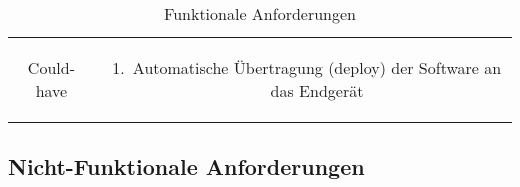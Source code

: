 \begin{table}[h!]
\begin{flushleft}
{\begin{tabular}{|c|c|}
\begin{minipage}{5in}
				\end{minipage} \\
				\hline
				Could-have & 
				\begin{minipage}{5in}
					\begin{enumerate}
						\item Automatische Übertragung (deploy) der Software an das Endgerät
					\end{enumerate}
				\end{minipage} \\
			\hline
			\end{tabular}	
		}
	\end{flushleft}
	\caption{Funktionale Anforderungen}	
\end{table}

\subsection{Nicht-Funktionale Anforderungen}
